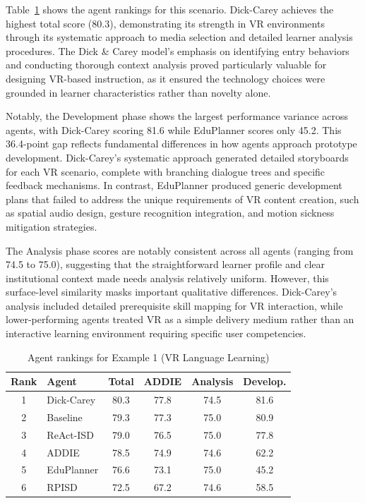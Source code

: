 Table~\ref{tab:example1} shows the agent rankings for this scenario. Dick-Carey achieves the highest total score (80.3), demonstrating its strength in VR environments through its systematic approach to media selection and detailed learner analysis procedures. The Dick \& Carey model's emphasis on identifying entry behaviors and conducting thorough context analysis proved particularly valuable for designing VR-based instruction, as it ensured the technology choices were grounded in learner characteristics rather than novelty alone.

Notably, the Development phase shows the largest performance variance across agents, with Dick-Carey scoring 81.6 while EduPlanner scores only 45.2. This 36.4-point gap reflects fundamental differences in how agents approach prototype development. Dick-Carey's systematic approach generated detailed storyboards for each VR scenario, complete with branching dialogue trees and specific feedback mechanisms. In contrast, EduPlanner produced generic development plans that failed to address the unique requirements of VR content creation, such as spatial audio design, gesture recognition integration, and motion sickness mitigation strategies.

The Analysis phase scores are notably consistent across all agents (ranging from 74.5 to 75.0), suggesting that the straightforward learner profile and clear institutional context made needs analysis relatively uniform. However, this surface-level similarity masks important qualitative differences. Dick-Carey's analysis included detailed prerequisite skill mapping for VR interaction, while lower-performing agents treated VR as a simple delivery medium rather than an interactive learning environment requiring specific user competencies.

\begin{table}[ht!]
\centering
\small
\caption{Agent rankings for Example 1 (VR Language Learning)}
\label{tab:example1}
\begin{tabular}{clcccc}
\toprule
\textbf{Rank} & \textbf{Agent} & \textbf{Total} & \textbf{ADDIE} & \textbf{Analysis} & \textbf{Develop.} \\
\midrule
1 & Dick-Carey & 80.3 & 77.8 & 74.5 & 81.6 \\
2 & Baseline & 79.3 & 77.3 & 75.0 & 80.9 \\
3 & ReAct-ISD & 79.0 & 76.5 & 75.0 & 77.8 \\
4 & ADDIE & 78.5 & 74.9 & 74.6 & 62.2 \\
5 & EduPlanner & 76.6 & 73.1 & 75.0 & 45.2 \\
6 & RPISD & 72.5 & 67.2 & 74.6 & 58.5 \\
\bottomrule
\end{tabular}
\end{table}

